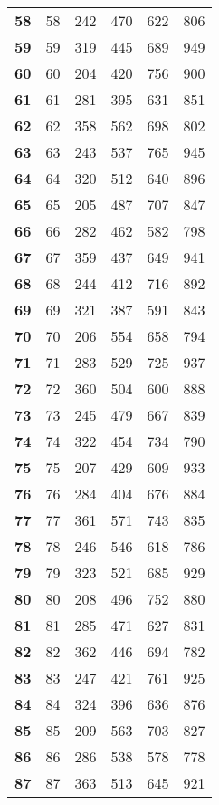 \begin{longtable}{|l|c|c|c|c|c|}
    \textbf{58} & 58 &242 & 470 & 622 & 806 \\
    \textbf{59} & 59 &319 & 445 & 689 & 949 \\
    \textbf{60} & 60 &204 & 420 & 756 & 900 \\
    \textbf{61} & 61 &281 & 395 & 631 & 851 \\
    \textbf{62} & 62 &358 & 562 & 698 & 802 \\
    \textbf{63} & 63 &243 & 537 & 765 & 945 \\
    \textbf{64} & 64 &320 & 512 & 640 & 896 \\
    \textbf{65} & 65 &205 & 487 & 707 & 847 \\
    \textbf{66} & 66 &282 & 462 & 582 & 798 \\
    \textbf{67} & 67 &359 & 437 & 649 & 941 \\
    \textbf{68} & 68 &244 & 412 & 716 & 892 \\
    \textbf{69} & 69 &321 & 387 & 591 & 843 \\
    \textbf{70} & 70 &206 & 554 & 658 & 794 \\
    \textbf{71} & 71 &283 & 529 & 725 & 937 \\
    \textbf{72} & 72 &360 & 504 & 600 & 888 \\
    \textbf{73} & 73 &245 & 479 & 667 & 839 \\
    \textbf{74} & 74 &322 & 454 & 734 & 790 \\
    \textbf{75} & 75 &207 & 429 & 609 & 933 \\
    \textbf{76} & 76 &284 & 404 & 676 & 884 \\
    \textbf{77} & 77 &361 & 571 & 743 & 835 \\
    \textbf{78} & 78 &246 & 546 & 618 & 786 \\
    \textbf{79} & 79 &323 & 521 & 685 & 929 \\
    \textbf{80} & 80 &208 & 496 & 752 & 880 \\
    \textbf{81} & 81 &285 & 471 & 627 & 831 \\
    \textbf{82} & 82 &362 & 446 & 694 & 782 \\
    \textbf{83} & 83 &247 & 421 & 761 & 925 \\
    \textbf{84} & 84 &324 & 396 & 636 & 876 \\
    \textbf{85} & 85 &209 & 563 & 703 & 827 \\
    \textbf{86} & 86 &286 & 538 & 578 & 778 \\
    \textbf{87} & 87 &363 & 513 & 645 & 921 \\

\end{longtable}
